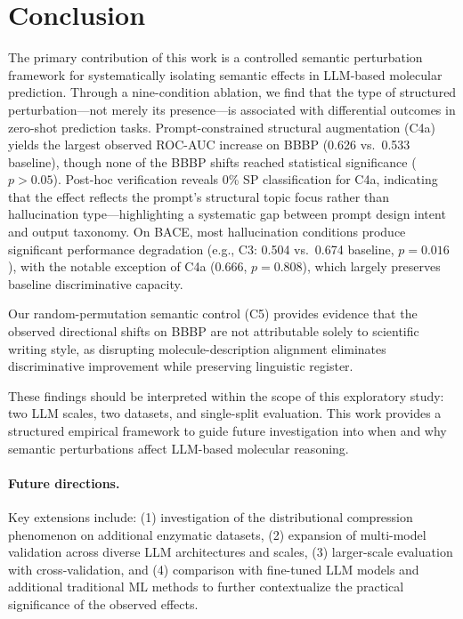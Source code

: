 \section{Conclusion}
\label{sec:conclusion}

The primary contribution of this work is a controlled semantic perturbation framework for systematically isolating semantic effects in LLM-based molecular prediction. Through a nine-condition ablation, we find that the type of structured perturbation---not merely its presence---is associated with differential outcomes in zero-shot prediction tasks. Prompt-constrained structural augmentation (C4a) yields the largest observed ROC-AUC increase on BBBP (0.626 vs.\ 0.533 baseline), though none of the BBBP shifts reached statistical significance ($p > 0.05$). Post-hoc verification reveals 0\% SP classification for C4a, indicating that the effect reflects the prompt's structural topic focus rather than hallucination type---highlighting a systematic gap between prompt design intent and output taxonomy. On BACE, most hallucination conditions produce significant performance degradation (e.g., C3: 0.504 vs.\ 0.674 baseline, $p = 0.016$), with the notable exception of C4a (0.666, $p = 0.808$), which largely preserves baseline discriminative capacity.

Our random-permutation semantic control (C5) provides evidence that the observed directional shifts on BBBP are not attributable solely to scientific writing style, as disrupting molecule-description alignment eliminates discriminative improvement while preserving linguistic register.

These findings should be interpreted within the scope of this exploratory study: two LLM scales, two datasets, and single-split evaluation. This work provides a structured empirical framework to guide future investigation into when and why semantic perturbations affect LLM-based molecular reasoning.

\paragraph{Future directions.} Key extensions include: (1) investigation of the distributional compression phenomenon on additional enzymatic datasets, (2) expansion of multi-model validation across diverse LLM architectures and scales, (3) larger-scale evaluation with cross-validation, and (4) comparison with fine-tuned LLM models and additional traditional ML methods to further contextualize the practical significance of the observed effects.

